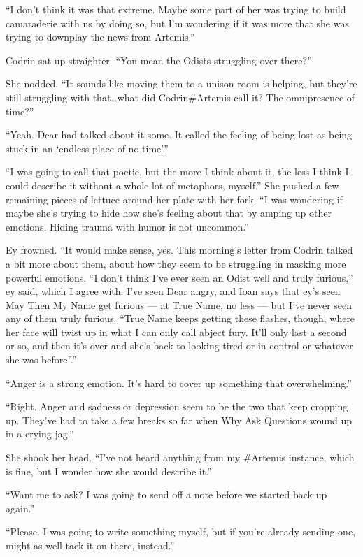``I don't think it was that extreme. Maybe some part of her was trying to build camaraderie with us by doing so, but I'm wondering if it was more that she was trying to downplay the news from Artemis.''

Codrin sat up straighter. ``You mean the Odists struggling over there?''

She nodded. ``It sounds like moving them to a unison room is helping, but they're still struggling with that\ldots what did Codrin\#Artemis call it? The omnipresence of time?''

``Yeah. Dear had talked about it some. It called the feeling of being lost as being stuck in an `endless place of no time'.''

``I was going to call that poetic, but the more I think about it, the less I think I could describe it without a whole lot of metaphors, myself.'' She pushed a few remaining pieces of lettuce around her plate with her fork. ``I was wondering if maybe she's trying to hide how she's feeling about that by amping up other emotions. Hiding trauma with humor is not uncommon.''

Ey frowned. ``It would make sense, yes. This morning's letter from Codrin talked a bit more about them, about how they seem to be struggling in masking more powerful emotions. ``I don't think I've ever seen an Odist well and truly furious,'' ey said, which I agree with. I've seen Dear angry, and Ioan says that ey's seen May Then My Name get furious — at True Name, no less — but I've never seen any of them truly furious. ``True Name keeps getting these flashes, though, where her face will twist up in what I can only call abject fury. It'll only last a second or so, and then it's over and she's back to looking tired or in control or whatever she was before''.''

``Anger is a strong emotion. It's hard to cover up something that overwhelming.''

``Right. Anger and sadness or depression seem to be the two that keep cropping up. They've had to take a few breaks so far when Why Ask Questions wound up in a crying jag.''

She shook her head. ``I've not heard anything from my \#Artemis instance, which is fine, but I wonder how she would describe it.''

``Want me to ask? I was going to send off a note before we started back up again.''

``Please. I was going to write something myself, but if you're already sending one, might as well tack it on there, instead.''

